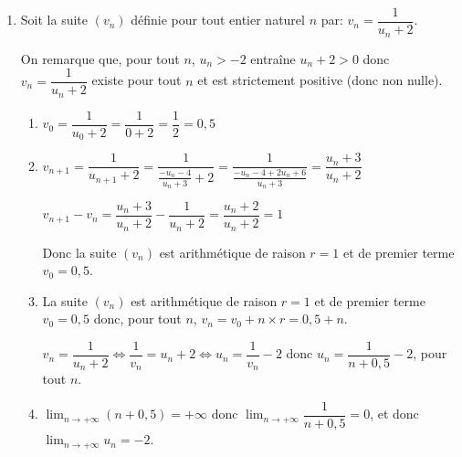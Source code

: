 \documentclass[10pt]{article}
\providecommand{\ds}{\displaystyle}
\begin{document}
\begin{enumerate}
\item Soit la suite $\left(v_n\right)$ définie pour tout entier naturel $n$ par: $v_n = \dfrac{1}{u_n + 2}$.

On remarque que, pour tout $n$, $u_n>-2$ entraîne $u_n+2>0$ donc $v_n = \dfrac{1}{u_n+2}$ existe pour tout $n$ et est strictement positive (donc non nulle).

	\begin{enumerate}
		\item $v_0 = \dfrac{1}{u_0+2} = \dfrac{1}{0+2} = \dfrac{1}{2}=0,5$
		
		\item 
$v_{n+1} = \dfrac{1}{u_{n+1}+2} 
= \dfrac{1}{\frac{-u_n-4}{u_n+3}+2}
= \dfrac{1}{\frac{-u_n-4 +2u_n+6}{u_n+3}}		
= \dfrac{u_n+3}{u_n+2}$

$v_{n+1}-v_n = \dfrac{u_n+3}{u_n+2} - \dfrac{1}{u_n+2}
=\dfrac{u_n+2}{u_n+2}=1$

Donc la suite $(v_n)$ est arithmétique de raison $r=1$ et de premier terme $v_0=0,5$.
			
		\item 
La suite $(v_n)$ est arithmétique de raison $r=1$ et de premier terme $v_0=0,5$ donc, pour tout $n$, $v_n=v_0+n\times r = 0,5 + n$.

$v_n=\dfrac{1}{u_n+2}
\iff
\dfrac{1}{v_n} = u_n+2
\iff
u_n=\dfrac{1}{v_n}-2$ donc $u_n=\dfrac{1}{n+0,5}-2$, pour tout $n$.

		\item 
$\ds\lim_{n\to +\infty} (n+0,5)=+\infty$ donc
$\ds\lim_{n\to +\infty} \dfrac{1}{n+0,5}=0$, et donc
$\ds\lim_{n\to +\infty} u_n=-2$.
	\end{enumerate}
\end{enumerate}

\bigskip
\end{document}
